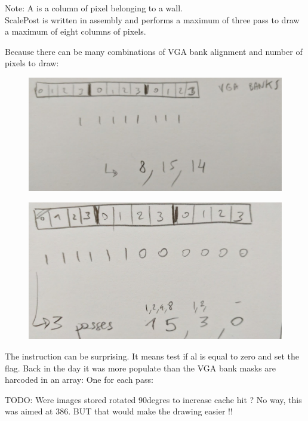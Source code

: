 Note: A  is a column of pixel belonging to a wall.\\
ScalePost is written in assembly and performs a maximum of three pass to draw a maximum of eight columns of pixels.\\
\par 
\begin{minipage}{\textwidth}

\end{minipage}
Because there can be many combinations of VGA bank alignment and number of pixels to draw:

\begin{figure}[H]
\centering
 \includegraphics[width=\textwidth]{imgs/scalePost_explanation1.png}
 \end{figure}
 
 \begin{figure}[H]
 \centering
 \includegraphics[width=\textwidth]{imgs/scalePost_explanation2.png}
 \end{figure}
The instruction  can be surprising. It means test if al is equal to zero and set the flag. Back in the day it was more populate than 
 the VGA bank masks are harcoded in an array: One for each pass:\\
 \par
 \begin{minipage}{\textwidth}

\end{minipage}
TODO: Were images stored rotated 90degres to increase cache hit ? No way, this was aimed at 386. BUT that would make the drawing easier !!

